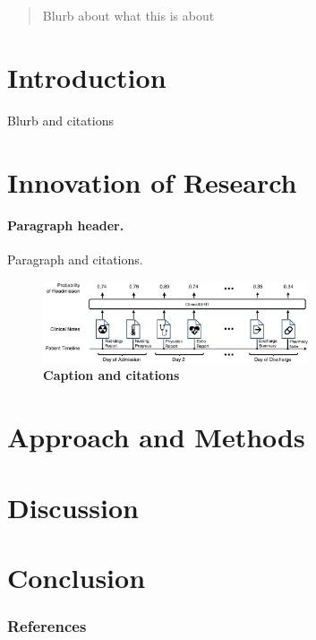 \documentclass[twoside]{article}
\begin{document}

\begin{abstract} 
Blurb about what this is about
\end{abstract}
\section{Introduction}

Blurb and citations

\section{Innovation of Research}

\paragraph{Paragraph header.} Paragraph and citations.

\begin{figure}
\centering
\begin{centering}
\includegraphics[width=0.7\textwidth]{main/figures/clinicalbert-diagram.pdf}
\end{centering}
\footnotesize
\caption{\label{fig:clinicalbert-diagram}  
\textbf{Caption and citations
}}
\end{figure}
\section{Approach and Methods}

\section{Discussion}

\section{Conclusion}

\subsubsection*{References} 
\printbibliography[heading=none]
\end{document}
